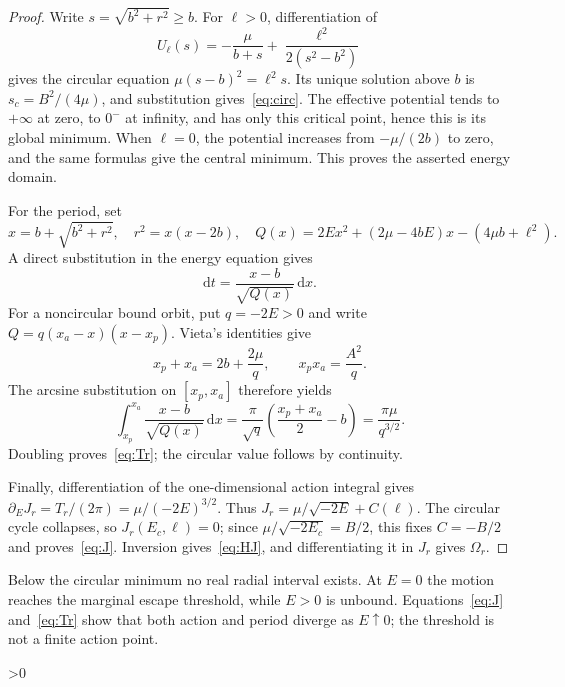 \documentclass[10pt]{article}
\providecommand{\CRevisionRound}{2}
\newcommand{\D}{\mathrm d}
\begin{document}
\begin{proof}
Write \(s=\sqrt{b^2+r^2}\geq b\).  For \(\ell>0\), differentiation of
\[
 U_\ell(s)=-\frac{\mu}{b+s}
 +\frac{\ell^2}{2(s^2-b^2)}
\]
gives the circular equation \(\mu(s-b)^2=\ell^2s\).  Its unique solution
above \(b\) is \(s_c=B^2/(4\mu)\), and substitution gives~\eqref{eq:circ}.
The effective potential tends to \(+\infty\) at zero, to \(0^-\) at
infinity, and has only this critical point, hence this is its global
minimum.  When \(\ell=0\), the potential increases from
\(-\mu/(2b)\) to zero, and the same formulas give the central minimum.
This proves the asserted energy domain.

For the period, set
\begin{equation}\label{eq:xQ}
 x=b+\sqrt{b^2+r^2},\quad r^2=x(x-2b),\quad
 Q(x)=2Ex^2+(2\mu-4bE)x-(4\mu b+\ell^2).
\end{equation}
A direct substitution in the energy equation gives
\begin{equation}\label{eq:dt}
 \D t=\frac{x-b}{\sqrt{Q(x)}}\,\D x.
\end{equation}
For a noncircular bound orbit, put \(q=-2E>0\) and write
\(Q=q(x_a-x)(x-x_p)\).  Vieta's identities give
\begin{equation}\label{eq:vieta}
 x_p+x_a=2b+\frac{2\mu}{q},\qquad
 x_px_a=\frac{A^2}{q}.
\end{equation}
The arcsine substitution on \([x_p,x_a]\) therefore yields
\[
 \int_{x_p}^{x_a}\frac{x-b}{\sqrt{Q(x)}}\,\D x
 =\frac{\pi}{\sqrt q}\left(\frac{x_p+x_a}{2}-b\right)
 =\frac{\pi\mu}{q^{3/2}}.
\]
Doubling proves~\eqref{eq:Tr}; the circular value follows by continuity.

Finally, differentiation of the one-dimensional action integral gives
\(\partial_EJ_r=T_r/(2\pi)=\mu/(-2E)^{3/2}\).  Thus
\(J_r=\mu/\sqrt{-2E}+C(\ell)\).  The circular cycle collapses, so
\(J_r(E_c,\ell)=0\); since \(\mu/\sqrt{-2E_c}=B/2\), this fixes
\(C=-B/2\) and proves~\eqref{eq:J}.  Inversion gives~\eqref{eq:HJ},
and differentiating it in \(J_r\) gives \(\Omega_r\).
\end{proof}

Below the circular minimum no real radial interval exists.  At \(E=0\)
the motion reaches the marginal escape threshold, while \(E>0\) is
unbound.  Equations~\eqref{eq:J} and~\eqref{eq:Tr} show that both action and
period diverge as \(E\uparrow0\); the threshold is not a finite action point.

\ifnum\CRevisionRound>0
\end{document}
